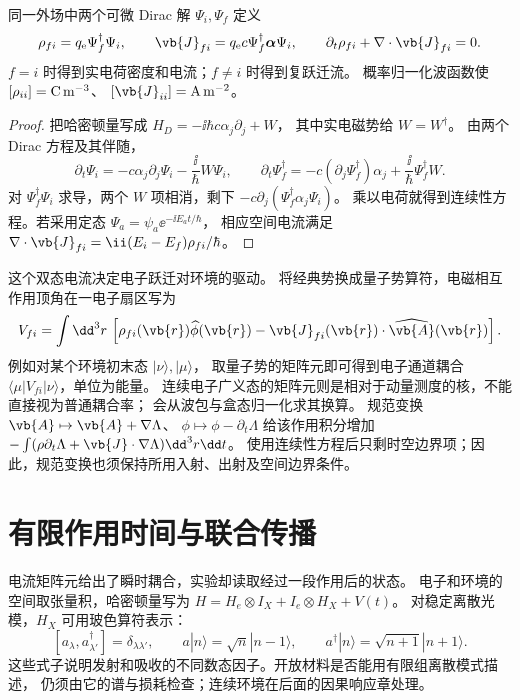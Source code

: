 \begin{proposition}[电荷电流与双态跃迁流]
同一外场中两个可微 Dirac 解 $\Psi_i,\Psi_f$ 定义
\begin{equation}
\rho_{fi}=q_{\mathrm e}\Psi_f^\dagger\Psi_i,\qquad
\vb{J}_{fi}=q_{\mathrm e}c\Psi_f^\dagger\boldsymbol\alpha\Psi_i,
\qquad \partial_t\rho_{fi}+\nabla\cdot\vb{J}_{fi}=0.
\label{eq:feqo-primer-current}
\end{equation}
$f=i$ 时得到实电荷密度和电流；$f\ne i$ 时得到复跃迁流。
概率归一化波函数使 $[\rho_{ii}]={\rm C\,m^{-3}}$、
$[\vb{J}_{ii}]={\rm A\,m^{-2}}$。
\end{proposition}
\begin{proof}
把哈密顿量写成 $H_D=-\ii\hbar c\alpha_j\partial_j+W$，
其中实电磁势给 $W=W^\dagger$。
由两个 Dirac 方程及其伴随，
\[
\partial_t\Psi_i=-c\alpha_j\partial_j\Psi_i-\frac{\ii}{\hbar}W\Psi_i,
\qquad
\partial_t\Psi_f^\dagger=-c(\partial_j\Psi_f^\dagger)\alpha_j
+\frac{\ii}{\hbar}\Psi_f^\dagger W.
\]
对 $\Psi_f^\dagger\Psi_i$ 求导，两个 $W$ 项相消，剩下
$-c\partial_j(\Psi_f^\dagger\alpha_j\Psi_i)$。
乘以电荷就得到连续性方程。若采用定态 $\Psi_a=\psi_a\ee^{-\ii E_at/\hbar}$，
相应空间电流满足
$\nabla\cdot\vb{J}_{fi}=\ii(E_i-E_f)\rho_{fi}/\hbar$。
\end{proof}

这个双态电流决定电子跃迁对环境的驱动。
将经典势换成量子势算符，电磁相互作用顶角在一电子扇区写为
\begin{equation}
V_{fi}=\int\dd^3r\,\left[\rho_{fi}(\vb{r})\widehat\phi(\vb{r})
-\vb{J}_{fi}(\vb{r})\cdot\widehat{\vb{A}}(\vb{r})\right].
\label{eq:feqo-primer-light-vertex}
\end{equation}
例如对某个环境初末态 $|\nu\rangle,|\mu\rangle$，
取量子势的矩阵元即可得到电子通道耦合 $\langle\mu|V_{fi}|\nu\rangle$，单位为能量。
连续电子广义态的矩阵元则是相对于动量测度的核，不能直接视为普通耦合率；
会从波包与盒态归一化求其换算。
规范变换 $\vb{A}\mapsto\vb{A}+\nabla\Lambda$、
$\phi\mapsto\phi-\partial_t\Lambda$ 给该作用积分增加
$-\int(\rho\partial_t\Lambda+\vb{J}\cdot\nabla\Lambda)\dd^3r\dd t$。
使用连续性方程后只剩时空边界项；因此，规范变换也须保持所用入射、出射及空间边界条件。

\section{有限作用时间与联合传播}\label{sec:feqo-primer-dynamics}

电流矩阵元给出了瞬时耦合，实验却读取经过一段作用后的状态。
电子和环境的空间取张量积，哈密顿量写为
$H=H_e\otimes I_X+I_e\otimes H_X+V(t)$。
对稳定离散光模，$H_X$ 可用玻色算符表示：
\[
[a_\lambda,a_{\lambda'}^\dagger]=\delta_{\lambda\lambda'},\qquad
a|n\rangle=\sqrt n|n-1\rangle,\qquad
a^\dagger|n\rangle=\sqrt{n+1}|n+1\rangle.
\]
这些式子说明发射和吸收的不同数态因子。开放材料是否能用有限组离散模式描述，
仍须由它的谱与损耗检查；连续环境在后面的因果响应章处理。


